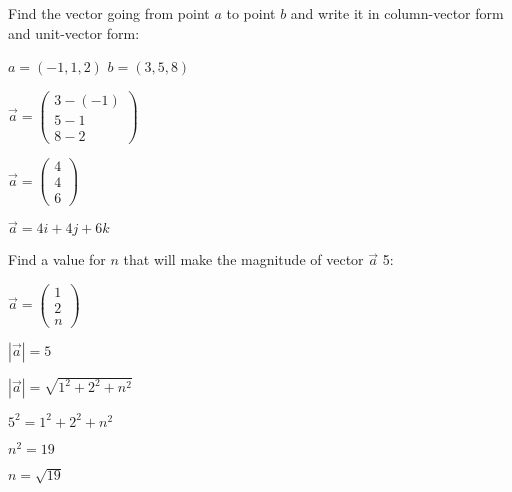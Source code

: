 \documentclass[12pt, twoside]{article}
\begin{document}
\begin{enumerate}
    
    \newpage
    \item Find the vector going from point $a$ to point $b$ and write it in column-vector form and unit-vector form:
    
    \begin{center}
        $a = (-1, 1, 2)$ \hspace{1cm} $b = (3, 5, 8)$
    \end{center}

    \begin{center}
        \item $\vec{a} = \begin{pmatrix} 3 - (-1) \\ 5 - 1 \\ 8 - 2 \end{pmatrix}$
        \item $\vec{a} = \begin{pmatrix} 4 \\ 4 \\ 6 \end{pmatrix}$
        \item $\vec{a} = 4i + 4j + 6k$
    \end{center}

    \vspace{1cm}
    
    \item Find a value for $n$ that will make the magnitude of vector $\vec{a}$ 5:
    
    \begin{center}
        \item $\vec{a} = \begin{pmatrix} 1 \\ 2 \\ n \end{pmatrix}$
    \end{center}

    \begin{center}
        \item $|\vec{a}| = 5$
        \item $|\vec{a}| = \sqrt{1^2 + 2^2 + n^2}$
        \item $5^2 = 1^2 + 2^2 + n^2$
        \item $n^2 = 19$
        \item $n = \sqrt{19}$
    \end{center}

    \vspace{1cm}
    

\end{enumerate}
\end{document}
